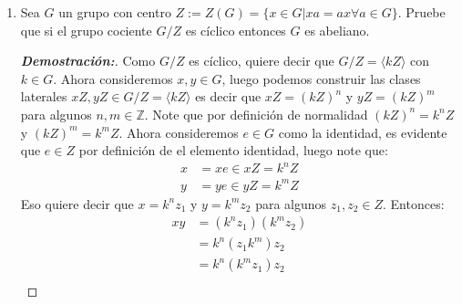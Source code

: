 \documentclass[12pt]{article}
\begin{document}
\begin{enumerate}
\begin{proof}[\textbf{Solución:}]
\begin{itemize}
        \begin{itemize}
            \item $H_7=\{\rho_0,\rho_1,\rho_2,\rho_3\}=\langle\rho_1\rangle=\langle\rho_3\rangle$
            \item $H_8=\{\rho_0,\rho_2,\mu_1,\mu_2\}=\langle\{\rho_2,\mu_1\}\rangle=\langle\{\rho_2,\mu_2\}\rangle$
            \item $H_9=\{\rho_0,\rho_2,\delta_1,\delta_2\}=\langle\{\rho_2,\delta_1\}\rangle=\langle\{\rho_2,\delta_2\}\rangle$
        \end{itemize}
        Por lo tanto tenemos tres imagenes homomorfas mas, que son:
        \begin{align*}
           \phi_3:D_4\to D_4/H_7\\
           \phi_4:D_4\to D_4/H_8\\
           \phi_5:D_4\to D_4/H_9
        \end{align*}
        \item \textbf{Orden 8:} Por ultimo tenemos el otro subgrupo trivial que es $H_{10}=D_4$ que es también evidente que es normal en si mismo, luego nuestra sexta y ultima imagen homomorfa es:
        $$\phi_6:D_4\to D_4/D_4$$
    \end{itemize}    
    \end{proof}
    \item Sea $G$ un grupo con centro $Z:=Z(G)=\{x\in G | xa=ax \forall a\in G\}$. Pruebe que si el grupo cociente $G/Z$ es cíclico entonces $G$ es abeliano.
    \begin{proof}[\textbf{Demostración:}] Como $G/Z$ es cíclico, quiere decir que $G/Z=\langle kZ\rangle$ con $k\in G$. Ahora consideremos $x,y\in G$, luego podemos construir las clases laterales $xZ,yZ\in G/Z=\langle kZ\rangle$ es decir que $xZ=(kZ)^n$ y $yZ=(kZ)^m$ para algunos $n,m\in\mathbb{Z}$. Note que por definición de normalidad $(kZ)^n=k^nZ$ y $(kZ)^m=k^mZ$. Ahora consideremos $e\in G$ como la identidad, es evidente que $e\in Z$ por definición de el elemento identidad, luego note que:
    \begin{align*}
        x&=xe\in xZ=k^nZ\\
        y&=ye\in yZ=k^mZ
    \end{align*}
    Eso quiere decir que $x=k^nz_1$ y $y=k^mz_2$ para algunos $z_1,z_2\in Z$. Entonces:
    \begin{align*}
        xy&=(k^nz_1)(k^mz_2)\\
          &=k^n(z_1k^m)z_2\\
          &=k^n(k^mz_1)z_2\\

\end{align*}
\end{proof}
\end{enumerate}
\end{document}
